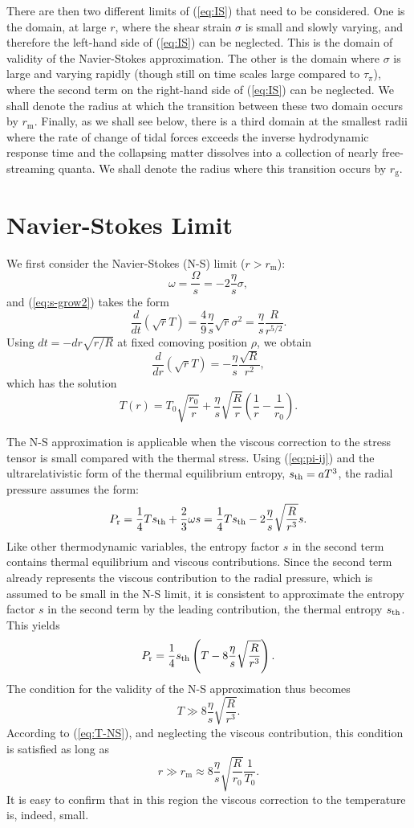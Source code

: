 \documentclass[article,twocolumn]{revtex4}
\newcommand{\be}{\begin{equation}}
\newcommand{\ee}{\end{equation}}
\begin{document}
There are then two different limits of (\ref{eq:IS}) that need to be considered. One is the domain, at large $r$, where the shear strain $\sigma$ is small and slowly varying, and therefore the left-hand side of (\ref{eq:IS}) can be neglected. This is the domain of validity of the Navier-Stokes approximation. The other is the domain where $\sigma$ is large and varying rapidly (though still on time scales large compared to $\tau_\pi$), where the second term on the right-hand side of (\ref{eq:IS}) can be neglected. We shall denote the radius at which the transition between these two domain occurs by $r_\mathrm{m}$. Finally, as we shall see below, there is a third domain at the smallest radii where the rate of change of tidal forces exceeds the inverse hydrodynamic response time and the collapsing matter dissolves into a collection of nearly free-streaming quanta. We shall denote the radius where this transition occurs by $r_\mathrm{g}$.

\section{Navier-Stokes Limit}

We first consider the Navier-Stokes (N-S) limit ($r > r_\mathrm{m}$):
\be
\omega = \frac{\Omega}{s} = - 2 \frac{\eta}{s} \sigma ,
\label{eq:omega-NS}
\ee
and (\ref{eq:s-grow2}) takes the form
\be 
\frac{d}{dt} \left( \sqrt{r} T \right) = \frac{4}{9} \frac{\eta}{s} \sqrt{r} \sigma^2 = \frac{\eta}{s} \frac{R}{r^{5/2}} .
\ee
Using $dt = - dr \sqrt{r/R}$ at fixed comoving position $\rho$, we obtain
\be
\frac{d}{dr} \left( \sqrt{r} T \right) = - \frac{\eta}{s} \frac{\sqrt{R}}{r^2} ,
\ee
which has the solution
\be
T(r) = T_0 \sqrt{\frac{r_0}{r}} + \frac{\eta}{s} \sqrt{\frac{R}{r}} \left( \frac{1}{r} - \frac{1}{r_0} \right) .
\label{eq:T-NS}
\ee

The N-S approximation is applicable when the viscous correction to the stress tensor is small compared with the thermal stress. Using (\ref{eq:pi-ij}) and the ultrarelativistic form of the thermal equilibrium entropy, $s_{\rm th}=aT^3$, the radial pressure assumes the form:
\be
P_{\rm r} = \frac{1}{4} T s_{\rm th} + \frac{2}{3} \omega s
= \frac{1}{4} T s_{\rm th} - 2 \frac{\eta}{s} \sqrt{\frac{R}{r^3}} s .
\ee
Like other thermodynamic variables, the entropy factor $s$ in the second term contains thermal equilibrium and viscous contributions. Since the second term already represents the viscous contribution to the radial pressure, which is assumed to be small in the N-S limit, it is consistent to approximate the entropy factor $s$ in the second term by the leading contribution, the thermal entropy $s_{\rm th}$. This yields
\be
P_{\rm r} = \frac{1}{4} s_{\rm th} \left( T - 8 \frac{\eta}{s} \sqrt{\frac{R}{r^3}} \right) .
\ee
The condition for the validity of the N-S approximation thus becomes
\be
T \gg 8 \frac{\eta}{s} \sqrt{\frac{R}{r^3}} .
\label{eq:NS-cond}
\ee
According to (\ref{eq:T-NS}), and neglecting the viscous contribution, this condition is satisfied as long as
\be
r \gg r_\mathrm{m} \approx 8 \frac{\eta}{s} \sqrt{\frac{R}{r_0}} \frac{1}{T_0} .
\label{eq:r-NS}
\ee
It is easy to confirm that in this region the viscous correction to the temperature is, indeed, small.
\end{document}
